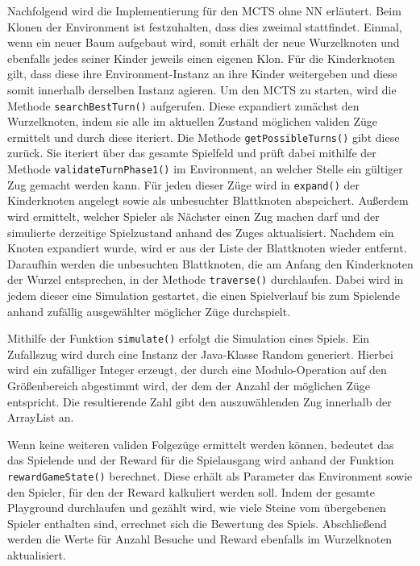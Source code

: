 \documentclass[12pt,a4paper]{article}
\begin{document}
Nachfolgend wird die Implementierung für den MCTS ohne NN erläutert. Beim Klonen der Environment ist festzuhalten, dass dies zweimal stattfindet. Einmal, wenn ein neuer Baum aufgebaut wird, somit erhält der neue Wurzelknoten und ebenfalls jedes seiner Kinder jeweils einen eigenen Klon. Für die Kinderknoten gilt, dass diese ihre Environment-Instanz an ihre Kinder weitergeben und diese somit innerhalb derselben Instanz agieren. Um den MCTS zu starten, wird die Methode \texttt{searchBestTurn()} aufgerufen. Diese expandiert zunächst den Wurzelknoten, indem sie alle im aktuellen Zustand möglichen validen Züge ermittelt und durch diese iteriert. Die Methode \texttt{getPossibleTurns()} gibt diese zurück. Sie iteriert über das gesamte Spielfeld und prüft dabei mithilfe der Methode \texttt{validateTurnPhase1()} im Environment, an welcher Stelle ein gültiger Zug gemacht werden kann. Für jeden dieser Züge wird in \texttt{expand()} der Kinderknoten angelegt sowie als unbesuchter Blattknoten abspeichert. Außerdem wird ermittelt, welcher Spieler als Nächster einen Zug machen darf und der simulierte derzeitige Spielzustand anhand des Zuges aktualisiert. Nachdem ein Knoten expandiert wurde, wird er aus der Liste der Blattknoten wieder entfernt.
Daraufhin werden die unbesuchten Blattknoten, die am Anfang den Kinderknoten der Wurzel entsprechen, in der Methode \texttt{traverse()} durchlaufen. Dabei wird in jedem dieser eine Simulation gestartet, die einen Spielverlauf bis zum Spielende anhand zufällig ausgewählter möglicher Züge durchspielt. 

Mithilfe der Funktion \texttt{simulate()} erfolgt die Simulation eines Spiels. Ein Zufallszug wird durch eine Instanz der Java-Klasse Random generiert. Hierbei wird ein zufälliger Integer erzeugt, der durch eine Modulo-Operation auf den Größenbereich abgestimmt wird, der dem der Anzahl der möglichen Züge entspricht. Die resultierende Zahl gibt den auszuwählenden Zug innerhalb der ArrayList an.

Wenn keine weiteren validen Folgezüge ermittelt werden können, bedeutet das das Spielende und der Reward für die Spielausgang wird anhand der Funktion \texttt{rewardGameState()} berechnet. Diese erhält als Parameter das Environment sowie den Spieler, für den der Reward kalkuliert werden soll. Indem der gesamte Playground durchlaufen und gezählt wird, wie viele Steine vom übergebenen Spieler enthalten sind, errechnet sich die Bewertung des Spiels. Abschließend werden die Werte für Anzahl Besuche und Reward ebenfalls im Wurzelknoten aktualisiert.
\end{document}
